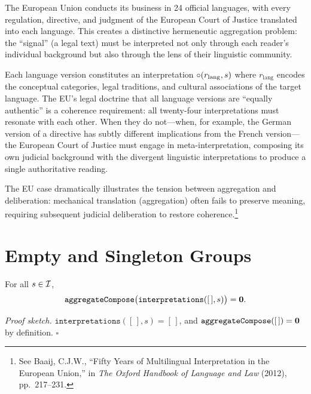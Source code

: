 \begin{example}
\label{ex:eu_multilingual}
The European Union conducts its business in 24 official languages, with
every regulation, directive, and judgment of the European Court of Justice
translated into each language.  This creates a distinctive hermeneutic
aggregation problem: the ``signal'' (a legal text) must be interpreted
not only through each reader's individual background but also through the
lens of their linguistic community.

Each language version constitutes an interpretation $\circ(r_{\text{lang}}, s)$
where $r_{\text{lang}}$ encodes the conceptual categories, legal traditions,
and cultural associations of the target language.  The EU's legal doctrine
that all language versions are ``equally authentic'' is a coherence
requirement: all twenty-four interpretations must resonate with each other.
When they do not---when, for example, the German version of a directive
has subtly different implications from the French version---the European
Court of Justice must engage in meta-interpretation, composing its own
judicial background with the divergent linguistic interpretations to
produce a single authoritative reading.

The EU case dramatically illustrates the tension between aggregation and
deliberation: mechanical translation (aggregation) often fails to preserve
meaning, requiring subsequent judicial deliberation to restore
coherence.\footnote{See Baaij, C.J.W., ``Fifty Years of Multilingual
Interpretation in the European Union,'' in \textit{The Oxford Handbook
of Language and Law} (2012), pp.\ 217--231.}
\end{example}

\section{Empty and Singleton Groups}
\label{sec:ch19-empty}

\begin{theorem}
\label{thm:empty_group_void}
For all $s \in \mathcal{I}$,
\[
  \texttt{aggregateCompose}\bigl(\texttt{interpretations}([\,], s)\bigr) = \mathbf{0}.
\]
\end{theorem}

\noindent\textit{Proof sketch.}\quad
$\texttt{interpretations}([\,], s) = [\,]$, and
$\texttt{aggregateCompose}([\,]) = \mathbf{0}$ by definition.
\hfill$\square$

